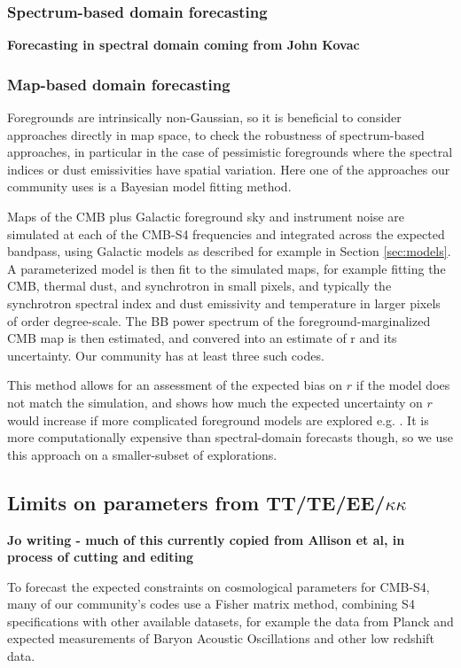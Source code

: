 \subsubsection{Spectrum-based domain forecasting}
{\bf Forecasting in spectral domain coming from John Kovac}

\subsubsection{Map-based domain forecasting}

Foregrounds are intrinsically non-Gaussian, so it is beneficial to consider approaches directly in map space, to check the robustness of spectrum-based approaches, in particular in the case of pessimistic foregrounds where the spectral indices or dust emissivities have spatial variation. Here one of the approaches our community uses is a Bayesian model fitting method.

Maps of the CMB plus Galactic foreground sky and instrument noise are simulated at each of the CMB-S4 frequencies and integrated across the expected bandpass, using Galactic models as described for example in Section \ref{sec:models}. A parameterized model is then fit to the simulated maps, for example fitting the CMB, thermal dust, and synchrotron in small pixels, and typically the synchrotron spectral index and dust emissivity and temperature in larger pixels of order degree-scale. The BB power spectrum of the foreground-marginalized CMB map is then estimated, and convered into an estimate of r and its uncertainty. Our community has at least three such codes.

This method allows for an assessment of the expected bias on $r$ if the model does not match the simulation, and shows how much the expected uncertainty on $r$ would increase if more complicated foreground models are explored e.g. \cite{armitage-caplan/etal:2011,ramazeilles/etal:2015}. It is more computationally expensive than spectral-domain forecasts though, so we use this approach on a smaller-subset of explorations. 

\subsection{Limits on parameters from TT/TE/EE/$\kappa\kappa$}

{\bf Jo writing - much of this currently copied from Allison et al, in process of cutting and editing}

To forecast the expected constraints on cosmological parameters for CMB-S4, many of our community's codes use a Fisher matrix method, combining S4 specifications with other available datasets, for example the data from Planck and expected measurements of Baryon Acoustic Oscillations and other low redshift data. 

